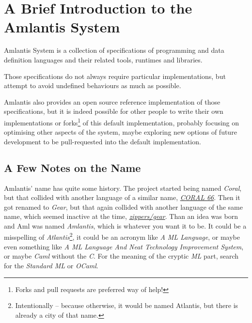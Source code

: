 
\chapter{A Brief Introduction to the Amlantis System}
\label{sec:brief-intro}

Amlantis System is a collection of specifications of programming and data definition languages and their related tools, runtimes and libraries. 

Those specifications do not always require particular implementations, but attempt to avoid undefined behaviours as much as possible. 

Amlantis also provides an open source reference implementation of those specifications, but it is indeed possible for other people to write their own implementations or forks\footnote{Forks and pull requests are preferred way of help!} of this default implementation, probably focusing on optimising other aspects of the system, maybe exploring new options of future development to be pull-requested into the default implementation. 





\section*{A Few Notes on the Name}

Amlantis' name has quite some history. The project started being named {\em Coral}, but that collided with another language of a similar name, \href{https://en.wikipedia.org/wiki/Coral_66}{{\em CORAL 66}}. Then it got renamed to {\em Gear}, but that again collided with another language of the same name, which seemed inactive at the time, \href{https://github.com/zippers/gear}{{\em zippers/gear}}. Than an idea was born and Aml was named {\em Amlantis}, which is whatever you want it to be. It could be a misspelling of {\em Atlantis}\footnote{Intentionally -- because otherwise, it would be named Atlantis, but there is already a city of that name.}, it could be an acronym like {\em A ML Language}, or maybe even something like {\em A ML Language And Neat Technology Improvement System}, or maybe {\em Caml} without the {\em C}. For the meaning of the cryptic {\em ML} part, search for the {\em Standard ML} or {\em OCaml}. 





\newpage

